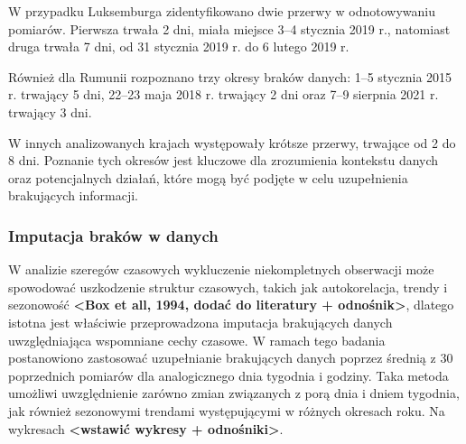 \documentclass[polish, twoside, 12pt, a4paper]{article}
\theoremstyle{definition}
\theoremstyle{plain}
\theoremstyle{remark}
\begin{document}




W przypadku Luksemburga zidentyfikowano dwie przerwy w odnotowywaniu pomiarów. Pierwsza trwała 2 dni, miała miejsce 3–4 stycznia 2019 r., natomiast druga trwała 7 dni, od 31 stycznia 2019 r. do 6 lutego 2019 r.

Również dla Rumunii rozpoznano trzy okresy braków danych: 1–5 stycznia 2015 r. trwający 5 dni, 22–23 maja 2018 r. trwający 2 dni oraz 7–9 sierpnia 2021 r. trwający 3 dni.

W innych analizowanych krajach występowały krótsze przerwy, trwające od 2 do 8 dni. Poznanie tych okresów jest kluczowe dla zrozumienia kontekstu danych oraz potencjalnych działań, które mogą być podjęte w celu uzupełnienia brakujących informacji.

\subsubsection{Imputacja braków w danych}

W analizie szeregów czasowych wykluczenie niekompletnych obserwacji może spowodować uszkodzenie struktur czasowych, takich jak autokorelacja, trendy i sezonowość \textbf{<Box et all, 1994, dodać do literatury + odnośnik>}, dlatego istotna jest właściwie przeprowadzona imputacja brakujących danych uwzględniająca wspomniane cechy czasowe. W ramach tego badania postanowiono zastosować uzupełnianie brakujących danych poprzez średnią z 30 poprzednich pomiarów dla analogicznego dnia tygodnia i godziny. Taka metoda umożliwi uwzględnienie zarówno zmian związanych z porą dnia i dniem tygodnia, jak również sezonowymi trendami występującymi w różnych okresach roku. Na wykresach \textbf{<wstawić wykresy + odnośniki>}.
\end{document}
